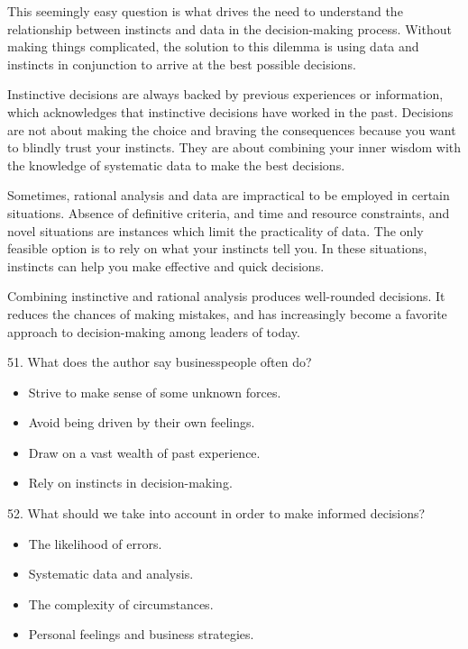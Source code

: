\documentclass[UTF8,11pt]{ctexart}
\begin{document}
This seemingly easy question is what drives the need to understand the relationship between instincts and data in the decision-making process. Without making things complicated, the solution to this dilemma is using data and instincts in conjunction to arrive at the best possible decisions.


Instinctive decisions are always backed by previous experiences or information, which acknowledges that instinctive decisions have worked in the past. Decisions are not about making the choice and braving the consequences because you want to blindly trust your instincts. They are about combining your inner wisdom with the knowledge of systematic data to make the best decisions.


Sometimes, rational analysis and data are impractical to be employed in certain situations. Absence of definitive criteria, and time and resource constraints, and novel situations are instances which limit the practicality of data. The only feasible option is to rely on what your instincts tell you. In these situations, instincts can help you make effective and quick decisions.


Combining instinctive and rational analysis produces well-rounded decisions. It reduces the chances of making mistakes, and has increasingly become a favorite approach to decision-making among leaders of today.


51. What does the author say businesspeople often do?


\begin{itemize}[leftmargin=2em,itemsep=.2em,topsep=.4em]\item[A.] Strive to make sense of some unknown forces.
\item[B.] Avoid being driven by their own feelings.
\item[C.] Draw on a vast wealth of past experience.
\item[D.] Rely on instincts in decision-making.
\end{itemize}

52. What should we take into account in order to make informed decisions?


\begin{itemize}[leftmargin=2em,itemsep=.2em,topsep=.4em]\item[A.] The likelihood of errors.
\item[B.] Systematic data and analysis.
\item[C.] The complexity of circumstances.
\item[D.] Personal feelings and business strategies.
\end{itemize}
\end{document}
